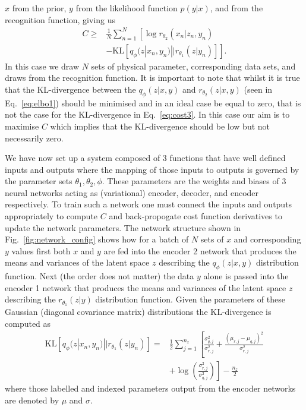 \documentclass[%
showpacs,
 amsmath,amssymb,
 aps,
 twocolumn,
 prl,
 reprint,
floatfix,
]{revtex4-1}
\begin{document}
$x$ from the prior, $y$ from the likelihood function $p(y|x)$, and from the
recognition function, giving us
%
\begin{align}\label{eq:cost3}
C \geq & \frac{1}{N}\sum_{n=1}^{N}\left[\log
r_{\theta_{2}}(x_{n}|z_{n},y_{n})\right.\nonumber\\
&\left.-\text{KL}\left[q_{\phi}(z|x_{n},y_{n})||r_{\theta_{1}}(z|y_{n})\right]\right].
\end{align}
% 
In this case we draw $N$ sets of physical parameter, corresponding data
sets, and draws from the recognition function. It is important to note that
whilst it is true that the KL-divergence between the $q_{\phi}(z|x,y)$ and
$r_{\theta_{2}}(z|x,y)$ (seen in Eq.~\ref{eq:elbo1}) should be minimised and in
an ideal case be equal to zero, that is not the case for the KL-divergence in
Eq.~\ref{eq:cost3}. In this case our aim is to maximise $C$ which implies that
the KL-divergence should be low but not necessarily zero.

We have now set up a system composed of 3 functions that have well defined
inputs and outputs where the mapping of those inputs to outputs is governed by
the parameter sets $\theta_{1},\theta_{2},\phi$. These parameters are the
weights and biases of 3 neural networks acting as (variational) encoder,
decoder, and encoder respectively. To train such a network one must connect the
inputs and outputs appropriately to compute $C$ and back-propogate cost
function derivatives to update the network parameters. The network structure
shown in Fig.~\ref{fig:network_config} shows how for a batch of $N$ sets of $x$
and corresponding $y$ values first both $x$ and $y$ are fed into the encoder 2
network that produces the means and variances of the latent space $z$
describing the $q_{\phi}(z|x,y)$ distribution function. Next (the order does
not matter) the data $y$ alone is passed into the encoder 1 network that
produces the means and variances of the latent space $z$ describing the
$r_{\theta_{1}}(z|y)$ distribution function. Given the parameters of these
Gaussian (diagonal covariance matrix) distributions the $\text{KL}$-divergence
is computed as
%
\begin{align}\label{eq:klgauss}
\text{KL}\left[q_{\phi}(z|x_{n},y_{n})||r_{\theta_{1}}(z|y_{n})\right] =&
\frac{1}{2}\sum_{j=1}^{n_{z}}\left[\frac{\sigma_{q,j}^{2}}{\sigma_{r,j}^{2}} +
\frac{(\mu_{r,j}-\mu_{q,j})^{2}}{\sigma_{r,j}^{2}}\right.\nonumber\\ 
&\left.+
\log\left(\frac{\sigma_{r,j}^{2}}{\sigma_{q,j}^{2}}\right)\right] -
\frac{n_{z}}{2}
\end{align}
%
where those labelled and indexed parameters output from the encoder networks
are denoted by $\mu$ and $\sigma$.
\end{document}
